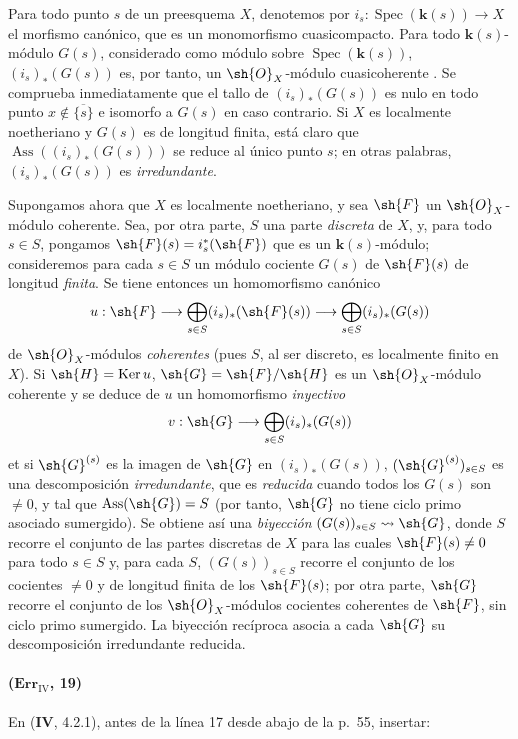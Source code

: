 \begin{remark}[3.2.9]
\label{IV.3.2.9}
Para todo punto $s$ de un preesquema $X$, denotemos por
$i_s:\operatorname{Spec}(\boldsymbol{k}(s))\to X$ el morfismo canónico, que es
un monomorfismo cuasicompacto. Para todo $\boldsymbol{k}(s)$-módulo $G(s)$,
considerado como módulo sobre $\operatorname{Spec}(\boldsymbol{k}(s))$,
$(i_s)_*(G(s))$ es, por tanto, un $\sh{O}_X$-módulo cuasicoherente
{}. Se comprueba inmediatamente
que el tallo de $(i_s)_*(G(s))$ es nulo en todo punto
$x\notin\overline{\{s\}}$ e isomorfo a $G(s)$ en caso contrario.
Si $X$ es localmente noetheriano y $G(s)$ es de longitud finita, está
claro que $\operatorname{Ass}((i_s)_*(G(s)))$ se reduce al único punto
$s$; en otras palabras, $(i_s)_*(G(s))$ es \emph{irredundante}.

Supongamos ahora que $X$ es localmente noetheriano, y sea $\sh{F}$ un
$\sh{O}_X$-módulo coherente. Sea, por otra parte, $S$ una parte \emph{discreta}
de $X$, y, para todo $s\in S$, pongamos
$\sh{F}(s)=i_s^*(\sh{F})$ que es un $\boldsymbol{k}(s)$-módulo; consideremos para
cada $s\in S$ un módulo cociente $G(s)$ de $\sh{F}(s)$ de longitud
\emph{finita}. Se tiene entonces un homomorfismo canónico
\[
 u:\sh{F}\longrightarrow
 \bigoplus_{s\in S}(i_s)_*(\sh{F}(s))\longrightarrow
 \bigoplus_{s\in S}(i_s)_*(G(s))
\]
de $\sh{O}_X$-módulos \emph{coherentes} (pues $S$, al ser discreto, es
localmente finito en $X$). Si $\sh{H}=\operatorname{Ker}u$,
$\sh{G}=\sh{F}/\sh{H}$ es un $\sh{O}_X$-módulo coherente y se deduce
de $u$ un homomorfismo \emph{inyectivo}
\[
 v:\sh{G}\longrightarrow\bigoplus_{s\in S}(i_s)_*(G(s))
\]
et si $\sh{G}^{(s)}$ es la imagen de $\sh{G}$ en $(i_s)_*(G(s))$,
$(\sh{G}^{(s)})_{s\in S}$ es una descomposición \emph{irredundante}, que es
\emph{reducida} cuando todos los $G(s)$ son $\neq0$, y tal que
$\operatorname{Ass}(\sh{G})=S$ (por tanto, $\sh{G}$ no tiene ciclo primo
asociado sumergido). Se obtiene así una \emph{biyección}
$(G(s))_{s\in S}\leadsto\sh{G}$, donde $S$ recorre el conjunto de las
partes discretas de $X$ para las cuales $\sh{F}(s)\neq0$ para todo
$s\in S$ y, para cada $S$, $(G(s))_{s\in S}$ recorre el conjunto
de los cocientes $\neq0$ y de longitud finita de los $\sh{F}(s)$; por otra
parte, $\sh{G}$ recorre el conjunto de los $\sh{O}_X$-módulos cocientes
coherentes de $\sh{F}$, sin ciclo primo sumergido. La biyección
recíproca asocia a cada $\sh{G}$ su descomposición irredundante
reducida.
\end{remark}

\paragraph{($\mathbf{Err}_{\mathrm{IV}}$, 19)}
En (\textbf{IV}, 4.2.1), antes de la línea 17 desde abajo de la p.~55, insertar:

